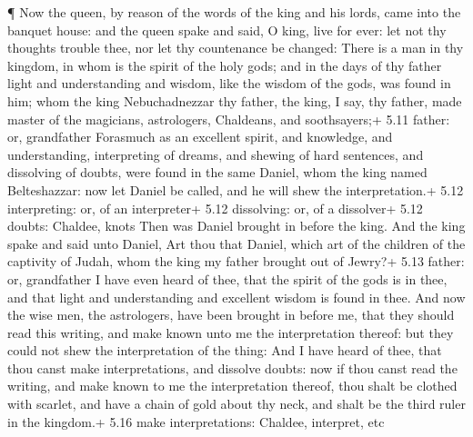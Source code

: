  ¶ Now the queen, by reason of the words of the king and
his lords, came into the banquet house: and the queen spake and said, O
king, live for ever: let not thy thoughts trouble thee, nor let thy
countenance be changed:  There is a man in thy kingdom, in
whom is the spirit of the holy gods; and in the days of thy father light
and understanding and wisdom, like the wisdom of the gods, was found in
him; whom the king Nebuchadnezzar thy father, the king, I say, thy
father, made master of the magicians, astrologers, Chaldeans, and
soothsayers;+ 5.11 father: or, grandfather  Forasmuch as an
excellent spirit, and knowledge, and understanding, interpreting of
dreams, and shewing of hard sentences, and dissolving of doubts, were
found in the same Daniel, whom the king named Belteshazzar: now let
Daniel be called, and he will shew the interpretation.+ 5.12
interpreting: or, of an interpreter+ 5.12 dissolving: or, of a
dissolver+ 5.12 doubts: Chaldee, knots  Then was Daniel
brought in before the king. And the king spake and said unto Daniel, Art
thou that Daniel, which art of the children of the captivity of Judah,
whom the king my father brought out of Jewry?+ 5.13 father: or,
grandfather  I have even heard of thee, that the spirit of
the gods is in thee, and that light and understanding and excellent
wisdom is found in thee.  And now the wise men, the
astrologers, have been brought in before me, that they should read this
writing, and make known unto me the interpretation thereof: but they
could not shew the interpretation of the thing:  And I have
heard of thee, that thou canst make interpretations, and dissolve
doubts: now if thou canst read the writing, and make known to me the
interpretation thereof, thou shalt be clothed with scarlet, and have a
chain of gold about thy neck, and shalt be the third ruler in the
kingdom.+ 5.16 make interpretations: Chaldee, interpret, etc


